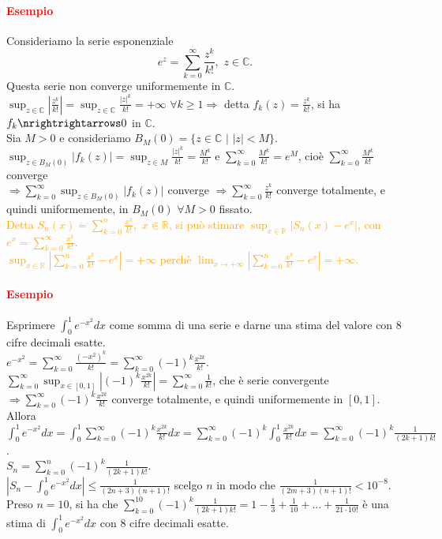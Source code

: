 \documentclass{article}
\newcommand{\R}{\mathbb{R}}
\newcommand{\C}{\mathbb{C}}
\begin{document}
\paragraph{\textcolor{red}{Esempio}}
Consideriamo la serie esponenziale
\begin{equation*}
    e^z= \sum_{k=0}^{\infty} \frac{z^k}{k!}, \,\,z \in \C.    
\end{equation*}
Questa serie non converge uniformemente in $\C$.\\
$\sup_{z\in\C}|\frac{z^k}{k!}|=\sup_{z\in\C}\frac{|z|^k}{k!}=+\infty\,\, \forall k \geq 1 \Rightarrow$ detta $f_k(z)=\frac{z^k}{k!}$, si ha $f_k \nrightrightarrows 0$ in $\C$.\\
Sia $M >0 $ e consideriamo $B_M(0)=\{z \in \C\,\, | \,\, |z|< M\}$.\\
$\sup_{z \in B_M(0)}|f_k(z)|=\sup_{z \in M}\frac{|z|^k}{k!}=\frac{M^k}{k!}$ e $\sum_{k=0}^{\infty} \frac{M^k}{k!}=e^M$, cioè $\sum_{k=0}^{\infty}\frac{M^k}{k!}$ converge\\ $\Rightarrow \sum_{k=0}^{\infty}\sup_{z \in B_M(0)}|f_k(z)|$ converge $\Rightarrow \sum_{k=0}^{\infty}\frac{z^k}{k!}$ converge totalmente, e quindi uniformemente, in $B_M(0) \,\, \forall M >0$ fissato.\\
\textcolor{orange}{Detta $S_n(x)=\sum_{k=0}^{n}\frac{x^k}{k!},\,\, x\in \R$, si può stimare $\sup_{x \in \R}|S_n(x)-e^x|$, con $e^x=\sum_{k=0}^{\infty}\frac{x^k}{k!}$.\\ $\sup_{ x \in \R}|\sum_{k=0}^{n} \frac{x^k}{k!}-e^x|=+\infty$ perchè $\lim_{x \rightarrow +\infty}|\sum_{k=0}^{n}\frac{x^k}{k!}-e^x|=+\infty$.}

\paragraph{\textcolor{red}{Esempio}}
Esprimere $\int_{0}^{1}e^{-x^2}dx$
 come somma di una serie e darne una stima del valore con $8$ cifre decimali esatte.\\
$e^{-x^2}=\sum_{k=0}^{\infty}\frac{(-x^2)^k}{k!}=\sum_{k=0}^{\infty}(-1)^k \frac{x^{2k}}{k!}$.\\
$\sum_{k=0}^{\infty}\sup_{x \in [0,1]}|(-1)^k \frac{x^{2k}}{k!}|=\sum_{k=0}^{\infty} \frac{1}{k!}$, che è serie convergente $\Rightarrow \sum_{k=0}^{\infty}(-1)^k \frac{x^{2k}}{k!}$ converge totalmente, e quindi uniformemente in $[0,1]$.\\
Allora $\int_{0}^{1}e^{-x^2}dx=\int_{0}^{1}\sum_{k=0}^{\infty}(-1)^k\frac{x^{2k}}{k!}dx=\sum_{k=0}^{\infty} (-1)^k \int_{0}^{1}\frac{x^{2k}}{k!}dx=\sum_{k=0}^{\infty}(-1)^k \frac{1}{(2k+1)k!}$.\\
$S_n=\sum_{k=0}^{n}(-1)^k \frac{1}{(2k+1)k!}$.\\ $|S_n-\int_{0}^{1}e^{-x^2}dx|\leq \frac{1}{(2n+3)(n+1)!}$ scelgo $n$ in modo che $\frac{1}{(2m+3)(n+1)!}<10^{-8}$.\\
Preso $n=10$, si ha che $\sum_{k=0}^{10}(-1)^k\frac{1}{(2k+1)k!}=1-\frac{1}{3}+\frac{1}{10}+...+\frac{1}{21\cdot10!}$ è una stima di $\int_{0}^{1}e^{-x^2}dx$ con $8$ cifre decimali esatte.
 
\end{document}
